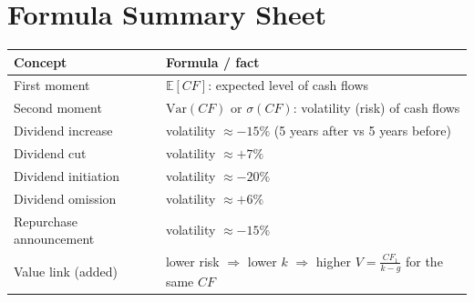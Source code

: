 \section{Formula Summary Sheet}
\begin{center}
\small
\renewcommand{\arraystretch}{1.4}
\begin{tabular}{@{}p{5cm}p{10cm}@{}}
\toprule
\textbf{Concept} & \textbf{Formula / fact}\\
\midrule
First moment & $\mathbb{E}[CF]$: expected level of cash flows\\
Second moment & $\text{Var}(CF)$ or $\sigma(CF)$: volatility (risk) of cash flows\\
Dividend increase & volatility $\approx-15\%$ (5 years after vs 5 years before)\\
Dividend cut & volatility $\approx+7\%$\\
Dividend initiation & volatility $\approx-20\%$\\
Dividend omission & volatility $\approx+6\%$\\
Repurchase announcement & volatility $\approx-15\%$\\
Value link (added) & lower risk $\Rightarrow$ lower $k$ $\Rightarrow$ higher $V=\frac{CF_1}{k-g}$ for the same $CF$\\
\bottomrule
\end{tabular}
\end{center}

